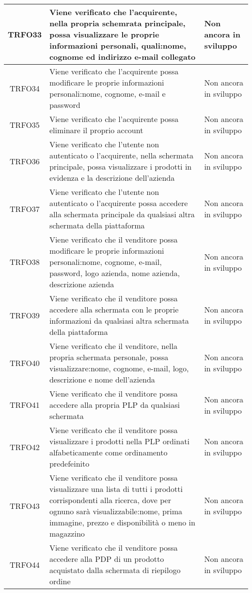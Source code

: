\begin{longtable}{|c| C{10cm} |C{3cm}|}
	TRFO33 & Viene verificato che l'acquirente, nella propria schemrata principale, possa visualizzare le proprie informazioni personali, quali:nome, cognome ed indirizzo e-mail collegato & Non ancora in sviluppo\\ \hline
	TRFO34 & Viene verificato che l'acquirente possa modificare le proprie informazioni personali:nome, cognome, e-mail e password & Non ancora in sviluppo\\ \hline
	TRFO35 & Viene verificato che l'acquirente possa eliminare il proprio account & Non ancora in sviluppo\\ \hline
	TRFO36 & Viene verificato che l'utente non autenticato o l'acquirente, nella schermata principale, possa visualizzare i prodotti in evidenza e la descrizione dell'azienda & Non ancora in sviluppo\\ \hline
	TRFO37 & Viene verificato che l'utente non autenticato o l'acquirente possa accedere alla schermata principale da qualsiasi altra schermata della piattaforma & Non ancora in sviluppo\\ \hline
    	TRFO38 & Viene verificato che il venditore possa modificare le proprie informazioni personali:nome, cognome, e-mail, password, logo azienda, nome azienda, descrizione azienda & Non ancora in sviluppo\\ \hline
	TRFO39 & Viene verificato che il venditore possa accedere alla schermata con le proprie informazioni da qualsiasi altra schermata della piattaforma & Non ancora in sviluppo\\ \hline
    	TRFO40 & Viene verificato che il venditore, nella propria schermata personale, possa visualizzare:nome, cognome, e-mail, logo, descrizione e nome dell'azienda & Non ancora in sviluppo\\ \hline
	TRFO41 & Viene verificato che il venditore possa accedere alla propria PLP da qualsiasi schermata & Non ancora in sviluppo\\ \hline
	TRFO42 & Viene verificato che il venditore possa visualizzare i prodotti nella PLP ordinati alfabeticamente come ordinamento predefeinito & Non ancora in sviluppo\\ \hline
	TRFO43 & Viene verificato che il venditore possa visualizzare una lista di tutti i prodotti corrispondenti alla ricerca, dove per ognuno sarà visualizzabile:nome, prima immagine, prezzo e disponibilità o meno in magazzino & Non ancora in sviluppo\\ \hline
	TRFO44 & Viene verificato che il venditore possa accedere alla PDP di un prodotto acquistato dalla schermata di riepilogo ordine & Non ancora in sviluppo\\ \hline

\end{longtable}
